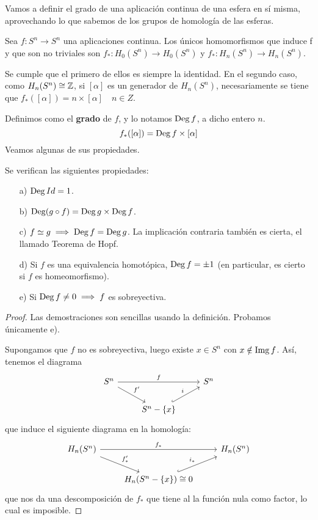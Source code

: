 Vamos a definir el grado de una aplicación continua de una esfera en sí misma, aprovechando lo que sabemos
de los grupos de homología de las esferas.

Sea $f \colon S^n \to S^n$ una aplicaciones continua. Los únicos homomorfismos que induce f y que son no triviales son
$f_* \colon H_0(S^n) \to H_0(S^n)$ y $f_* \colon H_n(S^n) \to H_n(S^n)$.

Se cumple que el primero de ellos es siempre la identidad. En el segundo caso, como $H_n(S^n) \cong \mathbb{Z}$, si $[\alpha]$ es un
generador de $H_n(S^n)$, necesariamente se tiene que $f_*([\alpha]) = n \times [\alpha] \quad n \in Z$.

Definimos como el \textbf{grado} de $f$, y lo notamos $\operatorname{Deg} f$, a dicho entero $n$.
\[ f_*([\alpha]) = \operatorname{Deg} f \times [\alpha] \]
Veamos algunas de sus propiedades.

\begin{proposition}[Propiedades]
  Se verifican las siguientes propiedades:
  \begin{itemize}
    \item[a)] $\operatorname{Deg} Id = 1$.
    \item[b)] $\operatorname{Deg} (g \circ f) = \operatorname{Deg} g \times \operatorname{Deg} f$.
    \item[c)] $f \simeq g \implies \operatorname{Deg} f = \operatorname{Deg} g$. La implicación contraria también es cierta, el llamado Teorema de Hopf.
    \item[d)] Si $f$ es una equivalencia homotópica, $\operatorname{Deg} f = \pm 1$ (en particular, es cierto si $f$ es homeomorfismo).
    \item[e)] Si $\operatorname{Deg} f \neq 0 \implies f$ es sobreyectiva.
  \end{itemize}
\end{proposition}

\begin{proof}
  Las demostraciones son sencillas usando la definición. Probamos únicamente e).

  Supongamos que $f$ no es sobreyectiva, luego existe $x \in S^n$ con $x \notin \operatorname{Img} f$. Así, tenemos el diagrama
  \[ \begin{tikzcd}
    S^n  \arrow{dr}{f'} \arrow{rr}{f} & & S^n  \\
    & S^n - \{x\} \arrow[hookrightarrow]{ur}{i}
  \end{tikzcd} \]
  que induce el siguiente diagrama en la homología:
  \[ \begin{tikzcd}
    H_n(S^n)  \arrow{dr}{f'_*} \arrow{rr}{f_*} & & H_n(S^n)  \\
    & H_n(S^n - \{x\}) \cong 0 \arrow[hookrightarrow]{ur}{i_*}
  \end{tikzcd} \]
  que nos da una descomposición de $f_*$ que tiene al la función nula como factor, lo cual es imposible.
\end{proof}

